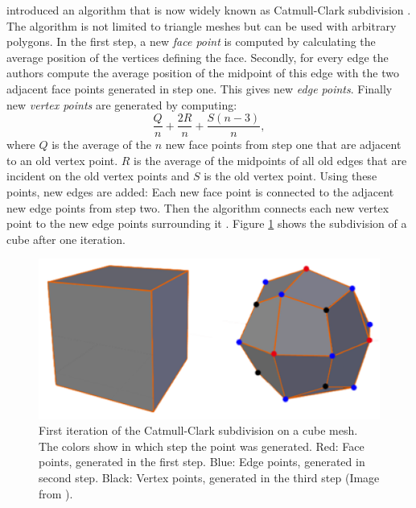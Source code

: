 \citeauthor{CATMULL1978350} introduced an algorithm that is now widely known as Catmull-Clark subdivision \cite{CATMULL1978350}.
The algorithm is not limited to triangle meshes but can be used with arbitrary polygons.
In the first step, a new \textit{face point} is computed by calculating the average position of the vertices defining the face.
Secondly, for every edge the authors compute the average position of the midpoint of this edge with the two adjacent face points generated in step one.
This gives new \textit{edge points}.
Finally new \textit{vertex points} are generated by computing:
\begin{equation*}
	\frac{Q}{n} + \frac{2R}{n} + \frac{S(n-3)}{n},
\end{equation*}
where $Q$ is the average of the $n$ new face points from step one that are adjacent to an old vertex point.
$R$ is the average of the midpoints of all old edges that are incident on the old vertex points and $S$ is the old vertex point.
Using these points, new edges are added: Each new face point is connected to the adjacent new edge points from step two.
Then the algorithm connects each new vertex point to the new edge points surrounding it \cite{CATMULL1978350}.
Figure \ref{fig:catmull_clark_subdivision} shows the subdivision of a cube after one iteration.
\begin{figure}[t]
    \centering
    \includegraphics[width=0.5\linewidth]{img/catmull_clark_subdivision.png}
    \caption[First iteration of the Catmull-Clark subdivision]{First iteration of the Catmull-Clark subdivision on a cube mesh. The colors show in which step the point was generated. Red: Face points, generated in the first step. Blue: Edge points, generated in second step. Black: Vertex points, generated in the third step (Image from \cite{cheng_catmull_clark_visualization}).}
    \label{fig:catmull_clark_subdivision}
\end{figure}

